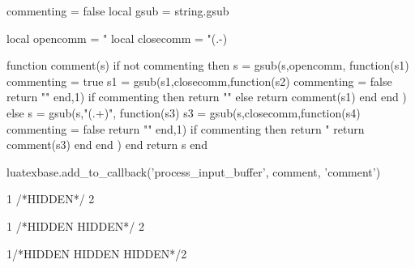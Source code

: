 

\begin{luacode*}

commenting = false
local gsub = string.gsub

local opencomm = "%
local closecomm = "(.-)%

function comment(s)
    if not commenting then
        s = gsub(s,opencomm,
                function(s1)
                commenting = true
                s1 =  gsub(s1,closecomm,function(s2) commenting = false return "" end,1)
                  if commenting then return "" else
                      return comment(s1)
                  end
              end
            )
    else
        s = gsub(s,"(.+)",
                function(s3)
                s3 =  gsub(s,closecomm,function(s4) commenting = false return "" end,1)
                    if commenting then return "%
                        return comment(s3)
                    end
                end
                )
    end
    return s
end

luatexbase.add_to_callback('process_input_buffer', comment, 'comment')
\end{luacode*}



1 /*HIDDEN*/ 2

1 /*HIDDEN
HIDDEN*/ 2

1/*HIDDEN
HIDDEN
HIDDEN*/2


